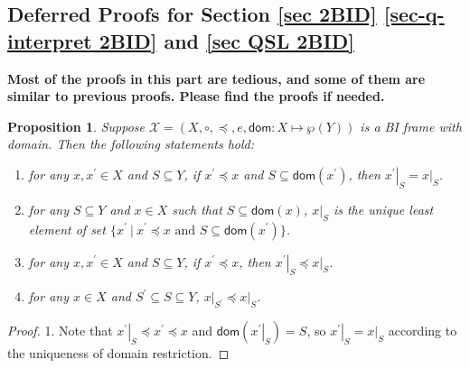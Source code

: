 \documentclass[conference,compsoc, 10pt]{IEEEtran}
\newtheorem{proposition}{Proposition}[section]
\newcommand {\cX } {{\mathcal{X}}}
\newcommand {\Ldoms } {{\mathsf{dom}}}
\newcommand {\Ldom }[1] {{\mathsf{dom}\!\left(#1\right)}}
\newcommand {\rt }[2] {{\left.{#1}\right|_{#2}}}
\begin{document}
\begin{appendices}
		
		
		
		
		
		
		
		
		
		
		
		
		
		
		
		
		
		
		
		
		
		
		
		
		
		
		
		
		
		
		
		
		
		
		
		
		
		
		
		
		
		
		
		
		
		
		
		
		
		
		
		\section{Deferred Proofs for Section \ref{sec 2BID} \ref{sec-q-interpret 2BID} and \ref{sec QSL 2BID}}
		
		\noindent\textbf{Most of the proofs in this part are tedious, and some of them are similar to previous proofs. Please find the proofs if needed.}
		
		\begin{proposition}
			\label{pro-unique}
			Suppose $\cX = (X,\circ,\preceq,e,\Ldoms: X\mapsto \wp(Y))$ is a BI frame with domain. Then the following statements hold:
			\begin{enumerate}
				\item for any $x,x^\prime\in X$ and $S\subseteq Y$, if $x^\prime\preceq x$ and $S\subseteq\Ldom{x^\prime}$, then $\rt{x^\prime}{S} = \rt{x}{S}$.
				\item for any $S\subseteq Y$ and $x\in X$ such that $S\subseteq\Ldom{x}$, $\rt{x}{S}$ is the unique least element of set $\{x^\prime\ |\ x^\prime\preceq x \text{\ and\ } S\subseteq\Ldom{x^\prime}\}$.
				\item for any $x,x^\prime\in X$ and $S\subseteq Y$, if $x^\prime\preceq x$, then $\rt{x^\prime}{S} \preceq \rt{x}{S}$.
				\item for any $x\in X$ and $S^\prime\subseteq S\subseteq Y$, $\rt{x}{S^\prime}\preceq \rt{x}{S}$.
			\end{enumerate}
		\end{proposition}
		\begin{proof}
			1. Note that $\rt{x^\prime}{S}\preceq x^\prime\preceq x$ and $\Ldom{\rt{x^\prime}{S}} = S$, so $\rt{x^\prime}{S} = \rt{x}{S}$ according to the uniqueness of domain restriction.
			

\end{proof}
\end{appendices}
\end{document}
